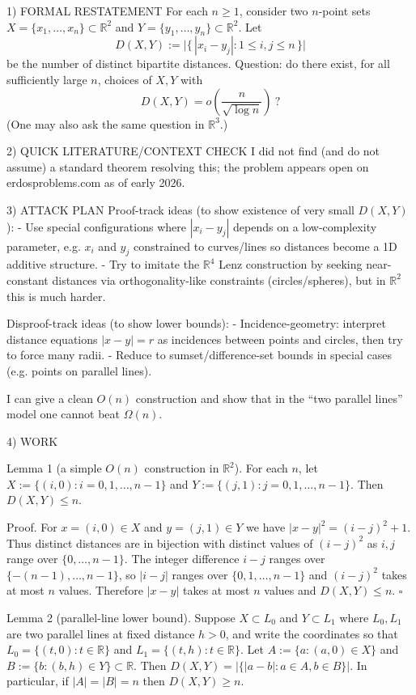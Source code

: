 1) FORMAL RESTATEMENT
For each $n\ge 1$, consider two $n$-point sets $X=\{x_1,\ldots,x_n\}\subset\mathbb{R}^2$ and $Y=\{y_1,\ldots,y_n\}\subset\mathbb{R}^2$.
Let
\[
D(X,Y):=\bigl|\{\,|x_i-y_j|:1\le i,j\le n\,\}\bigr|
\]
be the number of distinct bipartite distances.
Question: do there exist, for all sufficiently large $n$, choices of $X,Y$ with
\[
D(X,Y)=o\!\left(\frac{n}{\sqrt{\log n}}\right)\ ?
\]
(One may also ask the same question in $\mathbb{R}^3$.)

2) QUICK LITERATURE/CONTEXT CHECK
I did not find (and do not assume) a standard theorem resolving this; the problem appears open on erdosproblems.com as of early 2026.

3) ATTACK PLAN
Proof-track ideas (to show existence of very small $D(X,Y)$):
- Use special configurations where $|x_i-y_j|$ depends on a low-complexity parameter, e.g. $x_i$ and $y_j$ constrained to curves/lines so distances become a 1D additive structure.
- Try to imitate the $\mathbb{R}^4$ Lenz construction by seeking near-constant distances via orthogonality-like constraints (circles/spheres), but in $\mathbb{R}^2$ this is much harder.

Disproof-track ideas (to show lower bounds):
- Incidence-geometry: interpret distance equations $|x-y|=r$ as incidences between points and circles, then try to force many radii.
- Reduce to sumset/difference-set bounds in special cases (e.g. points on parallel lines).

I can give a clean $O(n)$ construction and show that in the ``two parallel lines'' model one cannot beat $\Omega(n)$.

4) WORK

Lemma 1 (a simple $O(n)$ construction in $\mathbb{R}^2$).
For each $n$, let
$X:=\{(i,0): i=0,1,\ldots,n-1\}$ and $Y:=\{(j,1): j=0,1,\ldots,n-1\}$.
Then $D(X,Y)\le n$.

Proof.
For $x=(i,0)\in X$ and $y=(j,1)\in Y$ we have $|x-y|^2=(i-j)^2+1$.
Thus distinct distances are in bijection with distinct values of $(i-j)^2$ as $i,j$ range over $\{0,\ldots,n-1\}$.
The integer difference $i-j$ ranges over $\{-(n-1),\ldots,n-1\}$, so $|i-j|$ ranges over $\{0,1,\ldots,n-1\}$ and $(i-j)^2$ takes at most $n$ values.
Therefore $|x-y|$ takes at most $n$ values and $D(X,Y)\le n$. $\square$

Lemma 2 (parallel-line lower bound).
Suppose $X\subset L_0$ and $Y\subset L_1$ where $L_0,L_1$ are two parallel lines at fixed distance $h>0$, and write the coordinates so that
$L_0=\{(t,0):t\in\mathbb{R}\}$ and $L_1=\{(t,h):t\in\mathbb{R}\}$.
Let $A:=\{a: (a,0)\in X\}$ and $B:=\{b: (b,h)\in Y\}\subset\mathbb{R}$. Then
$D(X,Y)=|\{|a-b|:a\in A,b\in B\}|$. In particular, if $|A|=|B|=n$ then $D(X,Y)\ge n$.

